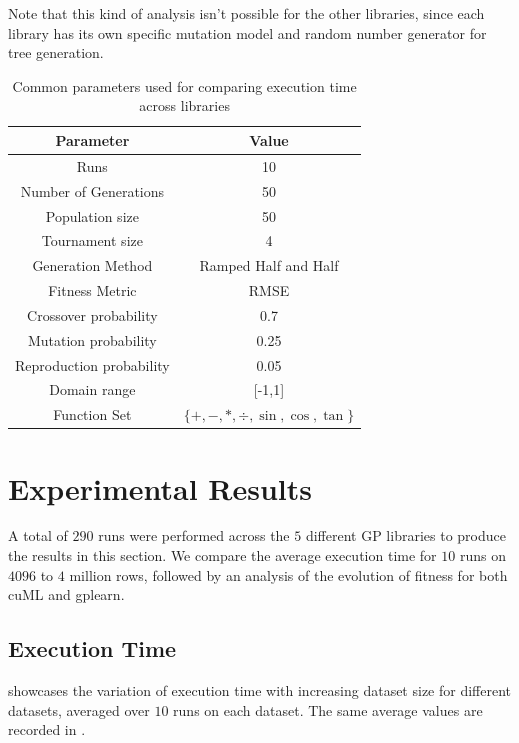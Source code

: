 Note that this kind of analysis isn't possible for the other libraries, since each library has its own specific mutation model and random number generator for tree generation. 

\begin{table}[htbp]
  \caption{Common parameters used for comparing execution time across libraries}
  \begin{center}
    \begin{tabular}[c]{cc}
      \toprule
      \textbf{Parameter} & \textbf{Value} \\
      \midrule
      Runs                      & 10      \\
      Number of Generations     & 50      \\
      Population size           & 50      \\
      Tournament size           & 4       \\ 
      Generation Method         & Ramped Half and Half \\
      Fitness Metric            & RMSE    \\
      Crossover probability     & 0.7     \\
      Mutation probability      & 0.25    \\
      Reproduction probability  & 0.05    \\
      Domain range              & [-1,1]  \\
      Function Set              & $\{+,-,*,\div,\sin ,\cos,\tan\}$ \\
      \bottomrule
    \end{tabular}
    \label{tab:params}
  \end{center}
\end{table}

\section{Experimental Results}
\label{sec:results}
A total of $290$ runs were performed across the $5$ different GP libraries to produce the results in this section. We compare the average execution time for $10$ runs on $4096$ to $4$ million rows, followed by an analysis of the evolution of fitness for both cuML and gplearn.

\subsection{Execution Time}
\label{subsec:exectimes}
 showcases the variation of execution time with increasing dataset size for different datasets, averaged over $10$ runs on each dataset. The same average values are recorded in .

